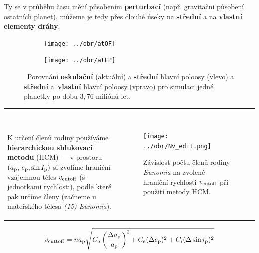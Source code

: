 \documentclass{beamer}
\newlength{\vyska}
\newlength{\vyskaA}
\newlength{\side}
\begin{document}
\begin{frame}
\begin{columns}[t]
\begin{column}{\side}
\begin{tcolorbox}[title=Metody nebeské mechaniky\phantom{Úy},height=0.665\vyskaA]
\vspace{1cm}

Ty se v průběhu času mění působením \textbf{perturbací} (např. gravitační působení ostatních planet), můžeme je tedy přes dlouhé úseky  na \textbf{střední} a na \textbf{vlastní elementy dráhy}.

		\vspace{1.0cm}

		\begin{figure}
			\centering
			\begin{subfigure}[b]{0.49\textwidth}
			\centering
			\texttt{[image: ../obr/atOF]}
			\end{subfigure}
			\begin{subfigure}[b]{0.49\textwidth}
			\centering
			\texttt{[image: ../obr/atFP]}
			\end{subfigure}
			\caption{\ Porovnání \textbf{oskulační} (aktuální) a \textbf{střední} hlavní poloosy (vlevo) a \textbf{střední} a~\textbf{vlastní} hlavní poloosy (vpravo) pro simulaci jedné planetky po dobu $3,76$ miliónů let.}
		\end{figure}
		\begin{tabularx}{\textwidth}{p{12cm}X}

		\

		K určení členů rodiny používáme \textbf{hierarchickou shlukovací metodu} (HCM) --- v prostoru $(a_{\rm p},\,e_{\rm p},\sin I_{\rm p})$ si zvolíme hraniční vzájemnou \uv{vzdálenost} těles $v_{\rm cutoff}$ (s jednotkami rychlosti), podle které pak určíme členy (začneme u mateřského tělesa \textit{(15) Eunomia}).

		&
		\begin{figure}
			\centering
			\texttt{[image: ../obr/Nv\_edit.png]}
			\caption{Závislost počtu členů rodiny \textit{Eunomia} na zvolené hraniční rychlosti $v_{\rm cutoff}$ při použití metody HCM.}
		\end{figure}
		\end{tabularx}
		\vspace{-0.5cm}
		{\begin{align*}
			v_{\rm cuttoff}=na_{\rm p}\sqrt{C_a\left(\frac{\Delta a_{\rm p}}{a_{\rm p}}\right)^2+C_e(\Delta e_{\rm p})^2+C_i(\Delta \sin i_{\rm p})^2}
		\end{align*}}


\end{tcolorbox}
\end{column}
\end{columns}
\end{frame}
\end{document}
